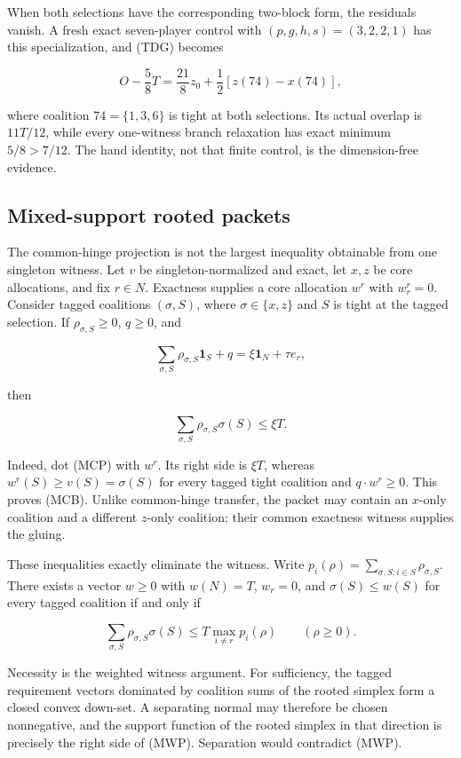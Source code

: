 \documentclass[11pt]{article}
\newcommand{\one}{\mathbf 1}
\begin{document}
When both selections have the corresponding two-block form, the residuals
vanish.  A fresh exact seven-player control with
$(p,g,h,s)=(3,2,2,1)$ has this specialization, and (TDG) becomes

\[
 O-\frac58T=\frac{21}{8}z_0+\frac12[z(74)-x(74)],
\]

where coalition $74=\{1,3,6\}$ is tight at both selections.  Its actual
overlap is $11T/12$, while every one-witness branch relaxation has exact
minimum $5/8>7/12$.  The hand identity, not that finite control, is the
dimension-free evidence.

\subsection{Mixed-support rooted packets}

The common-hinge projection is not the largest inequality obtainable from
one singleton witness.  Let $v$ be singleton-normalized and exact, let $x,z$
be core allocations, and fix $r\in N$.  Exactness supplies a core allocation
$w^r$ with $w^r_r=0$.  Consider tagged coalitions $(\sigma,S)$, where
$\sigma\in\{x,z\}$ and $S$ is tight at the tagged selection.  If
$\rho_{\sigma,S}\ge0$, $q\ge0$, and

\[
 \sum_{\sigma,S}\rho_{\sigma,S}\one_S+q
   =\xi\one_N+\tau e_r,                              \tag{MCP}
\]

then

\[
 \sum_{\sigma,S}\rho_{\sigma,S}\sigma(S)\le \xi T. \tag{MCB}
\]

Indeed, dot (MCP) with $w^r$.  Its right side is $\xi T$, whereas
$w^r(S)\ge v(S)=\sigma(S)$ for every tagged tight coalition and
$q\mathbin\cdot w^r\ge0$.  This proves (MCB).  Unlike common-hinge transfer,
the packet may contain an $x$-only coalition and a different $z$-only
coalition; their common exactness witness supplies the gluing.

These inequalities exactly eliminate the witness.  Write
$p_i(\rho)=\sum_{\sigma,S:i\in S}\rho_{\sigma,S}$.  There exists a vector
$w\ge0$ with $w(N)=T$, $w_r=0$, and
$\sigma(S)\le w(S)$ for every tagged coalition if and only if

\[
 \sum_{\sigma,S}\rho_{\sigma,S}\sigma(S)
 \le T\max_{i\ne r}p_i(\rho)\qquad(\rho\ge0).        \tag{MWP}
\]

Necessity is the weighted witness argument.  For sufficiency, the tagged
requirement vectors dominated by coalition sums of the rooted simplex form a
closed convex down-set.  A separating normal may therefore be chosen
nonnegative, and the support function of the rooted simplex in that direction
is precisely the right side of (MWP).  Separation would contradict (MWP).
\end{document}
